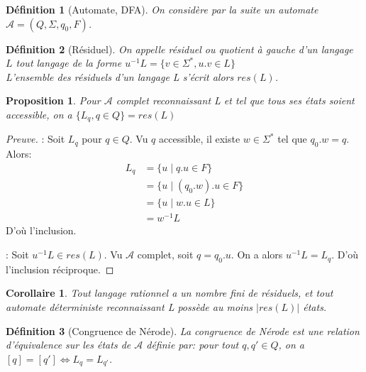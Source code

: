 \documentclass{article}
\newenvironment{preuve}{\begin{proof}[Preuve]}{\end{proof}}
\newtheorem{proposition}{Proposition}
\newtheorem{corollaire}{Corollaire}
\newtheorem{definition}{Définition}
\begin{document}
\begin{definition}[Automate, DFA]
    On considère par la suite un automate $\mathcal{A} = (Q, \Sigma, q_0, F)$.
\end{definition}


\begin{definition}[Résiduel]
    On appelle \emph{résiduel} ou \emph{quotient à gauche} d'un langage $L$ tout langage
    de la forme $u^{-1}L = \{v \in \Sigma^*, u.v \in L\}$ \\
    L'ensemble des résiduels d'un langage L s'écrit alors $res(L)$.
\end{definition}


\begin{proposition}
    Pour $\mathcal{A}$ complet reconnaissant L
    et tel que tous ses états soient accessible, on a
    $\{L_q, q \in Q\} = res(L)$
\end{proposition}

\begin{preuve}
    \fbox{$\subseteq$} : Soit $ L_q$ pour $q \in Q$. Vu $q$ accessible, il existe $w \in \Sigma^*$
    tel que $q_{0}.w = q$. Alors:
    \begin{align*}
        L_q & = \{u \;|\; q.u \in F\} \\
            & = \{u \;|\; (q_0.w).u \in F\} \\
            & = \{u \;|\; w.u \in L\} \\
            & = w^{-1}L
    \end{align*}
    D'où l'inclusion.
    
    \fbox{$\supseteq$} : Soit $u^{-1}L \in res(L)$. Vu $\mathcal{A}$ complet, soit
    $q = q_{0}.u$. On a alors $u^{-1}L = L_q$. D'où l'inclusion réciproque.
\end{preuve}

\begin{corollaire}
    Tout langage rationnel a un nombre fini de résiduels,
    et tout automate déterministe reconnaissant L possède au moins $|res(L)|$ états.
\end{corollaire}

\begin{definition}[Congruence de Nérode]
    La congruence de Nérode est une relation d'équivalence sur les états de $\mathcal{A}$
    définie par: pour tout $q, q' \in Q$, on a $[q] = [q'] \Leftrightarrow L_q = L_{q'}$.
\end{definition}

\end{document}
